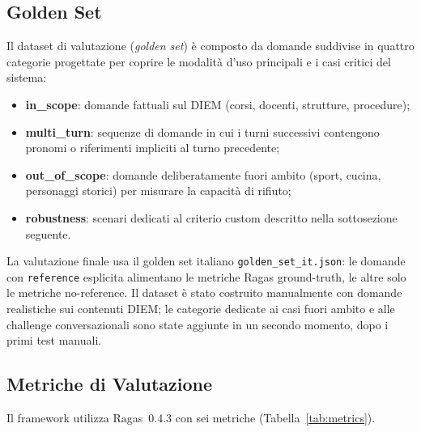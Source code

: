 \documentclass[11pt,a4paper]{article}
\newcommand{\code}[1]{\texttt{\small#1}}
\begin{document}
\subsection{Golden Set}

Il dataset di valutazione (\emph{golden set}) è composto da domande suddivise in quattro
categorie progettate per coprire le modalità d'uso principali e i casi critici del sistema:

\begin{itemize}
  \item \textbf{in\_scope}: domande fattuali sul DIEM (corsi, docenti, strutture, procedure);
  \item \textbf{multi\_turn}: sequenze di domande in cui i turni successivi contengono
        pronomi o riferimenti impliciti al turno precedente;
  \item \textbf{out\_of\_scope}: domande deliberatamente fuori ambito (sport, cucina,
        personaggi storici) per misurare la capacità di rifiuto;
  \item \textbf{robustness}: scenari dedicati al criterio custom descritto nella
        sottosezione seguente.
\end{itemize}

La valutazione finale usa il golden set italiano \code{golden\_set\_it.json}: le domande
con \code{reference} esplicita alimentano le metriche Ragas ground-truth, le altre solo le
metriche no-reference. Il dataset è stato costruito manualmente con domande realistiche
sui contenuti DIEM; le categorie dedicate ai casi fuori ambito e alle challenge
conversazionali sono state aggiunte in un secondo momento, dopo i primi test manuali.

\subsection{Metriche di Valutazione}

Il framework utilizza Ragas~0.4.3 \citep{es2023ragas} con sei metriche (Tabella~\ref{tab:metrics}).
\end{document}
